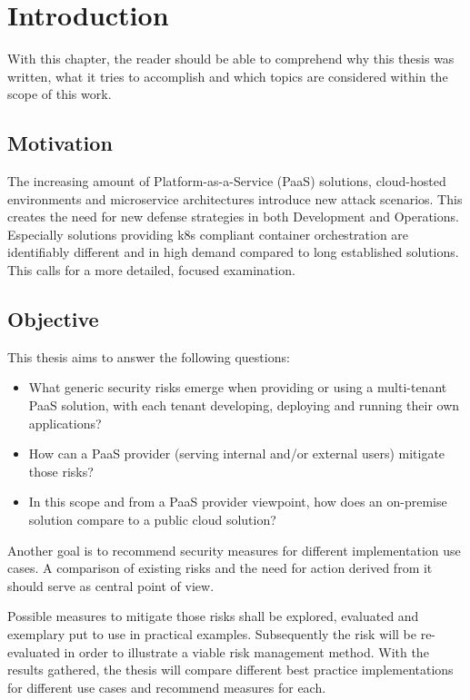\chapter{Introduction}
With this chapter, the reader should be able to comprehend why this thesis was written, 
what it tries to accomplish and which topics are considered within the scope of this work.

\section{Motivation}

The increasing amount of Platform-as-a-Service (PaaS) solutions, cloud-hosted environments and microservice architectures introduce new attack scenarios. 
This creates the need for new defense strategies in both Development and Operations. 
Especially solutions providing \gls{k8s} compliant container orchestration are identifiably different and in high demand compared to long established solutions. 
This calls for a more detailed, focused examination. 

\section{Objective}

This thesis aims to answer the following questions:

\begin{itemize}

\item What generic security risks emerge when providing or using a multi-tenant PaaS solution,
with each tenant developing, deploying and running their own applications? 

\item How can a PaaS provider (serving internal and/or external users) mitigate those risks? 

\item  In this scope and from a PaaS provider viewpoint, how does an on-premise solution compare
to a public cloud solution? 

\end{itemize}

Another goal is to recommend security measures for different implementation use cases.
A comparison of existing risks and the need for action derived from it should serve as central point of view.

Possible measures to mitigate those risks shall be explored, evaluated and exemplary put to use in practical examples.
Subsequently the risk will be re-evaluated in order to illustrate a viable risk management method.
With the results gathered, the thesis will compare different best practice implementations for different use cases and recommend measures for each.

